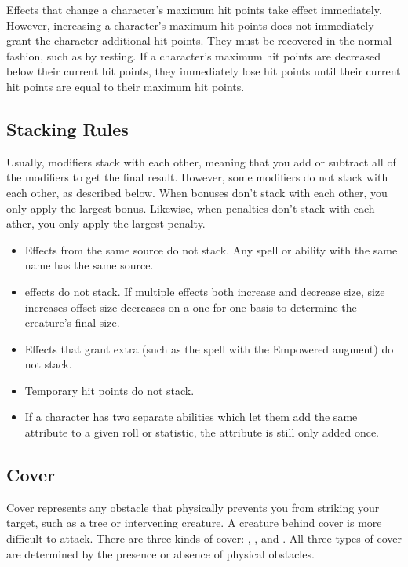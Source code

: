          Effects that change a character's maximum hit points take effect immediately.
        However, increasing a character's maximum hit points does not immediately grant the character additional hit points.
        They must be recovered in the normal fashion, such as by resting.
        If a character's maximum hit points are decreased below their current hit points, they immediately lose hit points until their current hit points are equal to their maximum hit points.

    \subsection{Stacking Rules}\label{Stacking Rules}
        Usually, modifiers stack with each other, meaning that you add or subtract all of the modifiers to get the final result. However, some modifiers do not stack with each other, as described below. When bonuses don't stack with each other, you only apply the largest bonus. Likewise, when penalties don't stack with each ather, you only apply the largest penalty.


        \begin{itemize}
            \item Effects from the same source do not stack. Any spell or ability with the same name has the same source.
            \item {} effects do not stack.
                If multiple effects both increase and decrease size, size increases offset size decreases on a one-for-one basis to determine the creature's final size.
            \item Effects that grant extra  (such as the  spell with the Empowered augment) do not stack.
            \item Temporary hit points do not stack.
            \item If a character has two separate abilities which let them add the same attribute to a given roll or statistic, the attribute is still only added once.
        \end{itemize}

    \subsection{Cover}\label{Cover}

        Cover represents any obstacle that physically prevents you from striking your target, such as a tree or intervening creature.
        A creature behind cover is more difficult to attack.
        There are three kinds of cover: , , and .
        All three types of cover are determined by the presence or absence of physical obstacles.

